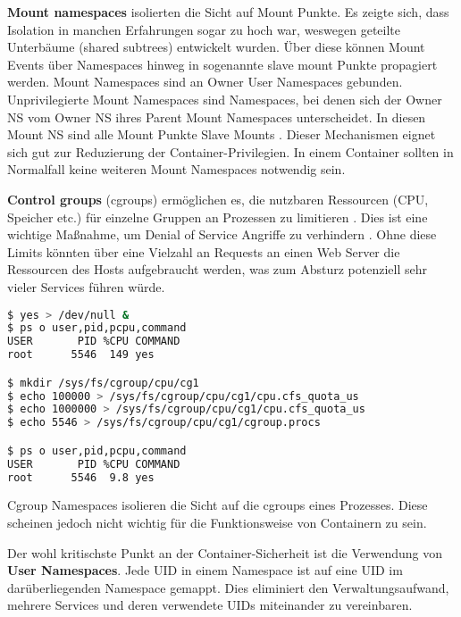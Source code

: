 \textbf{Mount namespaces} isolierten die Sicht auf Mount Punkte. Es zeigte sich, dass Isolation in manchen Erfahrungen sogar zu hoch war, weswegen geteilte Unterbäume (shared subtrees) entwickelt wurden. Über diese können Mount Events über Namespaces hinweg in sogenannte slave mount Punkte propagiert werden. Mount Namespaces sind an Owner User Namespaces gebunden. Unprivilegierte Mount Namespaces sind Namespaces, bei denen sich der Owner NS vom Owner NS ihres Parent Mount Namespaces
unterscheidet. In diesen Mount NS sind alle Mount Punkte Slave Mounts \cite{man-mount-ns}. Dieser Mechanismen eignet sich gut zur Reduzierung der Container-Privilegien. In einem Container sollten in Normalfall keine weiteren Mount Namespaces notwendig sein.

\textbf{Control groups} (cgroups) ermöglichen es, die nutzbaren Ressourcen (CPU, Speicher etc.) für einzelne Gruppen an Prozessen zu limitieren \cite{man-cgroups}. Dies ist eine wichtige Maßnahme, um Denial of Service Angriffe zu verhindern \cite{lxc-sec}. Ohne diese Limits könnten über eine Vielzahl an Requests an einen Web Server die Ressourcen des Hosts aufgebraucht werden, was zum Absturz potenziell sehr vieler Services führen würde.

\begin{lstlisting}[language=sh,caption={Ressourcenlimitierung einer DoS-Attacke (durch \texttt{yes} mimiert) mithilfe von cgroups}]
$ yes > /dev/null &
$ ps o user,pid,pcpu,command
USER       PID %CPU COMMAND
root      5546  149 yes

$ mkdir /sys/fs/cgroup/cpu/cg1
$ echo 100000 > /sys/fs/cgroup/cpu/cg1/cpu.cfs_quota_us
$ echo 1000000 > /sys/fs/cgroup/cpu/cg1/cpu.cfs_quota_us
$ echo 5546 > /sys/fs/cgroup/cpu/cg1/cgroup.procs

$ ps o user,pid,pcpu,command
USER       PID %CPU COMMAND
root      5546  9.8 yes
\end{lstlisting}

Cgroup Namespaces isolieren die Sicht auf die cgroups eines Prozesses. Diese scheinen jedoch nicht wichtig für die Funktionsweise von Containern zu sein.

Der wohl kritischste Punkt an der Container-Sicherheit ist die Verwendung von \textbf{User Namespaces}. Jede UID in einem Namespace ist auf eine UID im darüberliegenden Namespace gemappt. Dies eliminiert den Verwaltungsaufwand, mehrere Services und deren verwendete UIDs miteinander zu vereinbaren.

